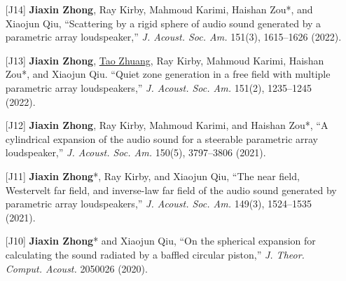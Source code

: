 \documentclass[10pt,a4paper,ragged2e,withhyper]{altacv}
\newcommand{\PubJournal}[1]{\textit{#1}}
\newcommand{\PubTitle}[1]{``{#1,}''}
\newcommand{\PubCorAuthor}[1]{#1*}
\newcommand{\PubMe}[1]{\textbf{#1}}
\begin{document}
\begin{itemize}[leftmargin = 30pt]
    \item[{[J14]}]
        \PubMe{Jiaxin Zhong}, Ray Kirby, Mahmoud Karimi, \PubCorAuthor{Haishan Zou}, and Xiaojun Qiu,
        \PubTitle{Scattering by a rigid sphere of audio sound generated by a parametric array loudspeaker} 
        \PubJournal{J. Acoust. Soc. Am.} 
        151(3), 1615--1626 (2022).
        \href{https://doi.org/10.1121/10.0009750}{\color{accent}\aiDoi}
        \href{https://github.com/JiaxinZhong/JiaxinZhong.github.io/raw/master/publications/journal/Zhong2022-JASA-PAL_sphere.pdf}{\color{accent}\faFilePdf[regular]}

    \item[{[J13]}]
        \PubMe{Jiaxin Zhong}, \underline{Tao Zhuang}, Ray Kirby, Mahmoud Karimi, \PubCorAuthor{Haishan Zou}, and Xiaojun
Qiu. 
        \PubTitle{Quiet zone generation in a free field with multiple parametric array loudspeakers} 
        \PubJournal{J. Acoust. Soc. Am.} 151(2), 1235--1245 (2022).
        \href{https://doi.org/10.1121/10.0009587}{\color{accent}\aiDoi}
        \href{https://github.com/JiaxinZhong/JiaxinZhong.github.io/raw/master/publications/journal/Zhong2022-JASA-PAL_ANC.pdf}{\color{accent}\faFilePdf[regular]}

    \item[{[J12]}]
        \PubMe{Jiaxin Zhong}, Ray Kirby, Mahmoud Karimi, and \PubCorAuthor{Haishan Zou}, 
        \PubTitle{A cylindrical expansion of the audio sound for a steerable parametric array loudspeaker}
        \PubJournal{J. Acoust. Soc. Am.}
        150(5), 3797--3806 (2021).
        \href{https://doi.org/10.1121/10.0007280}{\color{accent}\aiDoi}
        \href{https://github.com/JiaxinZhong/JiaxinZhong.github.io/raw/master/publications/journal/Zhong2021-JASA-PAL_cylindrical_expansion.pdf}{\color{accent}\faFilePdf[regular]}

    \item[{[J11]}]
        \PubCorAuthor{\PubMe{Jiaxin Zhong}}, Ray Kirby, and Xiaojun Qiu,         
        \PubTitle{The near field, Westervelt far field, and inverse-law far field of the audio sound generated by parametric array loudspeakers}
        \PubJournal{J. Acoust. Soc. Am.}
        149(3), 1524--1535 (2021).
        \href{https://doi.org/10.1121/10.0003606}{\color{accent}\aiDoi}
        \href{https://github.com/JiaxinZhong/JiaxinZhong.github.io/raw/master/publications/journal/Zhong2021-JASA-PAL_sound_field.pdf}{\color{accent}\faFilePdf[regular]}

    \item[{[J10]}]
        \PubCorAuthor{\PubMe{Jiaxin Zhong}} and Xiaojun Qiu,
        \PubTitle{On the spherical expansion for calculating the sound radiated by a baffled circular piston} 
        \PubJournal{J. Theor. Comput. Acoust.}
        2050026 (2020).
        \href{https://doi.org/10.1142/S2591728520500267}{\color{accent}\aiDoi}
        \href{https://github.com/JiaxinZhong/JiaxinZhong.github.io/raw/master/publications/journal/Zhong2020-JTCA-Piston_radiation.pdf}{\color{accent}\faFilePdf[regular]}


\end{itemize}
\end{document}
